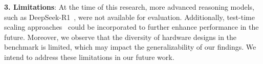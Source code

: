 \noindent \textbf{3. Limitations}: At the time of this research, more advanced reasoning models, such as DeepSeek-R1~\cite{guo2025deepseek}, were not available for evaluation. Additionally, test-time scaling approaches~\cite{welleck2024decoding} could be incorporated to further enhance performance in the future.
Moreover, we observe that the diversity of hardware designs in the benchmark is limited, which may impact the generalizability of our findings.
We intend to address these limitations in our future work.

